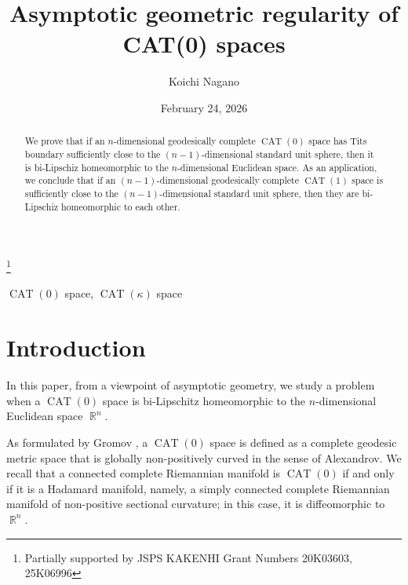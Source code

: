 \documentclass[a4paper,12pt]{amsart}
\newcommand{\CAT}{\operatorname{CAT}}
\newcommand{\R}{\operatorname{\mathbb{R}}}
\numberwithin{equation}{section}
\theoremstyle{plain}
\theoremstyle{definition}
\theoremstyle{remark}
\begin{document}
 

\title
[Asymptotic geometric regularity of CAT(0) spaces]
{Asymptotic geometric regularity of \\ CAT(0) spaces}

\author
[Koichi Nagano]{Koichi Nagano}

\thanks{
Partially supported
by JSPS KAKENHI Grant Numbers 20K03603, 25K06996}

\address
[Koichi Nagano]
{\endgraf 
Department of Mathematics, University of Tsukuba
\endgraf
Tennodai 1-1-1, Tsukuba, Ibaraki, 305-8571, Japan}


\date{February 24, 2026}

\keywords
{$\CAT(0)$ space, $\CAT(\kappa)$ space}

\begin{abstract}
We prove that if an $n$-dimensional geodesically complete 
$\CAT(0)$ space has Tits boundary sufficiently close to 
the $(n-1)$-dimensional standard unit sphere,
then it is bi-Lipschiz 
homeomorphic to the $n$-dimensional Euclidean space.
As an application,
we conclude that
if an $(n-1)$-dimensional geodesically complete 
$\CAT(1)$ space is sufficiently close to 
the $(n-1)$-dimensional standard unit sphere,
then they are bi-Lipschiz 
homeomorphic to each other.
\end{abstract}

\maketitle


\section{Introduction}

In this paper,
from a viewpoint of asymptotic geometry,
we study a problem
when a $\CAT(0)$ space is bi-Lipschitz homeomorphic to
the $n$-dimensional Euclidean space $\R^n$.

As formulated by Gromov \cite{gromovh},
a $\CAT(0)$ space 
is defined as a complete geodesic metric space
that is globally non-positively curved in the sense of Alexandrov.
We recall that
a connected complete Riemannian manifold is $\CAT(0)$
if and only if it is a Hadamard manifold,
namely,
a simply connected complete Riemannian manifold 
of non-positive sectional curvature;
in this case,
it is diffeomorphic to $\R^n$.
\end{document}
